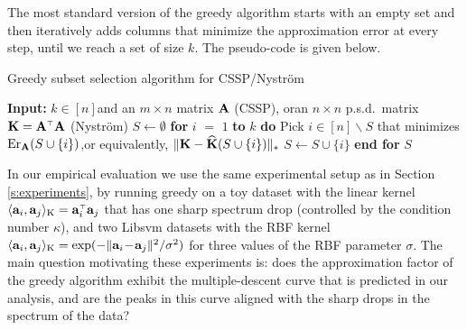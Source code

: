 \documentclass{article}
\begin{document}
The most standard version of the greedy algorithm
\citep[see, e.g.,][]{Bhaskara2016GreedyCSS} 
starts with an empty set and then
iteratively adds columns that minimize the 
approximation error at every step, until we reach a set of size
$k$. 
The pseudo-code is given below.
\renewcommand{\thealgorithm}{}
\begin{algorithm}[H]
  \caption{Greedy subset selection algorithm for CSSP/Nystr\"om}
  \begin{algorithmic}[0]
    \STATE \textbf{Input:} $k\in[n]$\quad and \quad an $m\times n$
    matrix $\mathbf A$ (CSSP), \quad or\quad an $n\times 
    n$ p.s.d.~matrix $\K=\A^\top\A$ (Nystr\"om)\vspace{2mm}
    \STATE $S\leftarrow \emptyset$
    \STATE \textbf{for} $i$ $=$ $1$ \textbf{to} $k$ \textbf{do}
    \STATE \quad Pick $i\in[n]\backslash S$ that minimizes $\mathrm{Er}_\mathbf A(S\cup\{i\})$,\quad or
    equivalently, $\|\mathbf K-{\widehat{\mathbf K}}(S\cup\{i\})\|_*$
    \STATE \quad$S\leftarrow S\cup\{i\}$
    \STATE \textbf{end for}\vspace{2mm}
    \RETURN $S$
  \end{algorithmic}
\end{algorithm}
In our empirical evaluation we use the same experimental setup as in
Section \ref{s:experiments}, by running greedy on a toy dataset with
the linear kernel $\langle\a_i,\a_j\rangle_\text{K}=\a_i^\top\a_j$
that has one sharp spectrum drop (controlled by the condition number $\kappa$),
and two Libsvm datasets with the RBF kernel
$\langle\mathbf a_i,\mathbf a_j\rangle_\text{K}=\exp(-\|\mathbf a_i\!-\!\mathbf a_j\|^2/\sigma^2)$
for three values of the RBF parameter $\sigma$. The main question
motivating these experiments is: does the approximation factor of the
greedy algorithm exhibit the multiple-descent curve that is predicted in
our analysis, and are the peaks in this curve aligned with the sharp drops
in the spectrum of the data?
\end{document}

